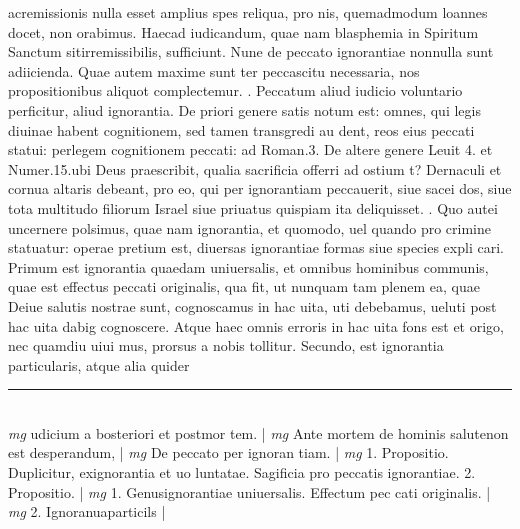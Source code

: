 \documentclass{article}
\begin{document}
\begin{pages}
acremissionis nulla esset amplius spes reliqua, pro nis, quemadmodum loannes docet, non orabimus. Haecad iudicandum, quae nam blasphemia in Spiritum Sanctum sitirremissibilis, sufficiunt.  \pend\pstart Nune de peccato ignorantiae nonnulla sunt adiicienda. Quae autem maxime sunt ter peccascitu necessaria, nos propositionibus aliquot complectemur.  \pend{}. Peccatum aliud iudicio voluntario perficitur, aliud ignorantia. De priori genere satis notum est: omnes, qui legis diuinae habent cognitionem, sed tamen transgredi au dent, reos eius peccati statui: perlegem cognitionem peccati: ad Roman.3. De altere genere Leuit 4. et Numer.15.ubi Deus praescribit, qualia sacrificia offerri ad ostium t? Dernaculi et cornua altaris debeant, pro eo, qui per ignorantiam peccauerit, siue sacei dos, siue tota multitudo filiorum Israel siue priuatus quispiam ita deliquisset.  \pend{}. Quo autei uncernere polsimus, quae nam ignorantia, et quomodo, uel quando pro crimine statuatur: operae pretium est, diuersas ignorantiae formas siue species expli cari. Primum est ignorantia quaedam uniuersalis, et omnibus hominibus communis, quae est effectus peccati originalis, qua fit, ut nunquam tam plenem ea, quae Deiue salutis nostrae sunt, cognoscamus in hac uita, uti debebamus, ueluti post hac uita dabig cognoscere. Atque haec omnis erroris in hac uita fons est et origo, nec quamdiu uiui mus, prorsus a nobis tollitur. Secundo, est ignorantia particularis, atque  alia quider  \pend
\vspace{0.5cm}\noindent
\vspace{0.2cm}\rule{1cm}{0.2pt}\\ 
\hspace{0.2cm}\textit{mg}
\footnotesize udicium a bosteriori et postmor tem. 
\normalsize| 
\hspace{0.2cm}\textit{mg}
\footnotesize Ante mortem de hominis salutenon est desperandum, 
\normalsize| 
\hspace{0.2cm}\textit{mg}
\footnotesize De peccato per ignoran tiam. 
\normalsize| 
\hspace{0.2cm}\textit{mg}
\footnotesize 1. Propositio. Duplicitur, exignorantia et uo luntatae. Sagificia pro peccatis ignorantiae. 2. Propositio. 
\normalsize| 
\hspace{0.2cm}\textit{mg}
\footnotesize 1. Genusignorantiae uniuersalis. Effectum pec cati originalis. 
\normalsize| 
\hspace{0.2cm}\textit{mg}
\footnotesize 2. Ignoranuaparticils 
\normalsize| 

\end{pages}
\end{document}
